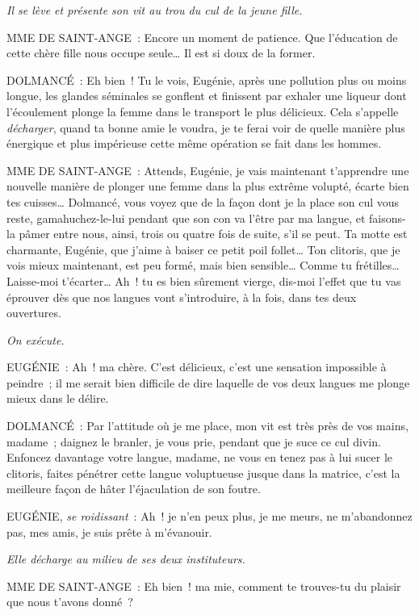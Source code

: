\documentclass[french,twoside]{book} %
\begin{document}
{\itshape Il se lève et présente son vit au trou du cul de la jeune fille.}\par
MME DE SAINT-ANGE : Encore un moment de patience. Que l’éducation de cette chère fille nous occupe seule… Il est si doux de la former.\par
DOLMANCÉ : Eh bien ! Tu le vois, Eugénie, après une pollution plus ou moins longue, les glandes séminales se gonflent et finissent par exhaler une liqueur dont l’écoulement plonge la femme dans le transport le plus délicieux. Cela s’appelle {\itshape décharger}, quand ta bonne amie le voudra, je te ferai voir de quelle manière plus énergique et plus impérieuse cette même opération se fait dans les hommes.\par
MME DE SAINT-ANGE : Attends, Eugénie, je vais maintenant t’apprendre une nouvelle manière de plonger une femme dans la plus extrême volupté, écarte bien tes cuisses… Dolmancé, vous voyez que de la façon dont je la place son cul vous reste, gamahuchez-le-lui pendant que son con va l’être par ma langue, et faisons-la pâmer entre nous, ainsi, trois ou quatre fois de suite, s’il se peut. Ta motte est charmante, Eugénie, que j’aime à baiser ce petit poil follet… Ton clitoris, que je vois mieux maintenant, est peu formé, mais bien sensible… Comme tu frétilles… Laisse-moi t’écarter… Ah ! tu es bien sûrement vierge, dis-moi l’effet que tu vas éprouver dès que nos langues vont s’introduire, à la fois, dans tes deux ouvertures.\par
{\itshape On exécute.}\par
EUGÉNIE : Ah ! ma chère. C’est délicieux, c’est une sensation impossible à peindre ; il me serait bien difficile de dire laquelle de vos deux langues me plonge mieux dans le délire.\par
DOLMANCÉ : Par l’attitude où je me place, mon vit est très près de vos mains, madame ; daignez le branler, je vous prie, pendant que je suce ce cul divin. Enfoncez davantage votre langue, madame, ne vous en tenez pas à lui sucer le clitoris, faites pénétrer cette langue voluptueuse jusque dans la matrice, c’est la meilleure façon de hâter l’éjaculation de son foutre.\par
EUGÉNIE, {\itshape se roidissant} : Ah ! je n’en peux plus, je me meurs, ne m’abandonnez pas, mes amis, je suis prête à m’évanouir.\par
{\itshape Elle décharge au milieu de ses deux instituteurs.}\par
MME DE SAINT-ANGE : Eh bien ! ma mie, comment te trouves-tu du plaisir que nous t’avons donné ?\par
\end{document}
